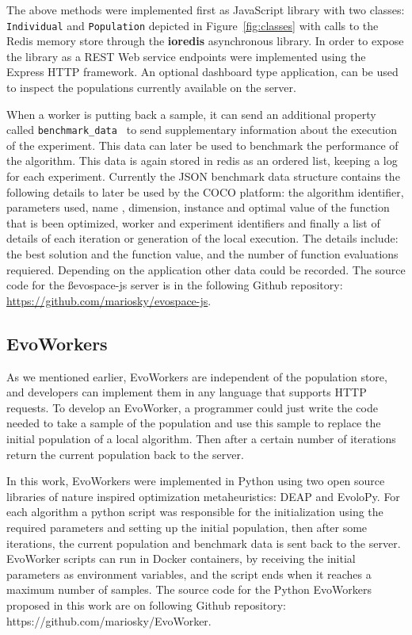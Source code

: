 The above methods were implemented first as JavaScript library 
with two classes: {\tt Individual} and {\tt Population} depicted 
in Figure~\ref{fig:classes} with calls to the Redis memory store 
through the {\bf ioredis} 
asynchronous library. In order to expose the library as a 
REST Web service endpoints were implemented using the Express HTTP framework. 
An optional dashboard type application, can be used to inspect 
the populations currently available on the server.


When a worker is putting back a sample, it can send 
an additional property called {\tt benchmark\_data }
to send supplementary information about the execution 
of the experiment.  This data can later be used to 
benchmark the performance of the algorithm. This 
data is again stored in redis as an ordered list, 
keeping a log for each experiment. Currently the JSON 
benchmark data structure contains the following details 
to later be used by the COCO platform: the algorithm identifier, 
parameters used, name , dimension, instance and optimal value 
of the function that is been optimized, worker and experiment 
identifiers and finally a list of details of each iteration 
or generation of the local execution. The details include:
the best solution and the function value, and the number of
function evaluations requiered. Depending on the application
other data could be recorded. The source code for the {\ss evospace-js}
server is in the following Github repository: 
\url{https://github.com/mariosky/evospace-js}.


\subsection{EvoWorkers}
\label{sec:evoworkers}
As we mentioned earlier, EvoWorkers are independent of 
the population store, and developers can implement them 
in any language that supports HTTP requests. To develop an 
EvoWorker, a programmer could just write the code needed to 
take a sample of the population and use this sample to 
replace the initial population of a local algorithm. 
Then after a certain number of iterations return the 
current population back to the server.

In this work, EvoWorkers were implemented in Python 
using two open source libraries of nature inspired optimization 
metaheuristics:  DEAP and EvoloPy. For each algorithm a 
python script was responsible for the initialization using 
the required parameters and setting up the initial population, 
then after some iterations, the current population and 
benchmark data is sent back to the server. EvoWorker 
scripts can run in Docker containers, by receiving 
the initial parameters as environment variables, and 
the script ends when it reaches a maximum number of samples.
The source code for the Python EvoWorkers
proposed in this work are on following Github repository: 
https://github.com/mariosky/EvoWorker.

